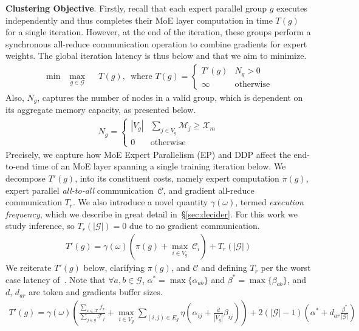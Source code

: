 \textbf{Clustering Objective}.
Firstly, recall that each expert parallel group $g$ executes independently and thus completes their MoE layer
computation in time $T(g)$ for a single iteration.
However, at the end of the iteration, these groups perform a synchronous all-reduce communication operation to
combine gradients for expert weights.
The global iteration latency is thus below and that we aim to minimize.
\begin{align}
    \label{eq:obj}
    \min \enspace \max_{g \in \mathcal{G}}\enspace & T(g),
    \enspace \text{where } T(g) = \begin{cases}
                                      T'(g) & N_g > 0 \\
                                      \infty & \text{otherwise}
    \end{cases}
\end{align}
Also, $N_g$, captures the number of nodes in a valid group, which is dependent on its aggregate memory capacity,
as presented below.
\begin{align}\label{eqn:omega_group}
N_g = \begin{cases}
          |V_g| & \sum\limits_{j \in V_g}{\mathcal{M}_j} \geq \mathcal{X}_m \\
          0 & \text{otherwise}
\end{cases}
\end{align}
Precisely, we capture how MoE Expert Parallelism (EP) and DDP affect the end-to-end time of an MoE layer spanning a
single training iteration below.
We decompose $T'(g)$, into its constituent costs, namely expert computation $\pi(g)$,
expert parallel \emph{all-to-all} communication~$\mathcal{C}$, and gradient all-reduce communication $T_r$.
We also introduce a novel quantity $\gamma(\omega)$, termed \emph{execution frequency},
which we describe in great detail in~\S\ref{sec:decider}.
For this work we study inference, so $T_{r}(|\mathcal{G}|) = 0$ due to no gradient communication.
\begin{align}\label{eqn:objective2}
T'(g) = \gamma(\omega)\left( \pi(g) + \max_{i \in V_g} \> \mathcal{C}_i \right) + T_{r}(|\mathcal{G}|)
\end{align}
We reiterate $T'(g)$ below,
clarifying $\pi(g)$, and $\mathcal{C}$ and defining $T_r$ per the worst case latency of~\cite{raben}.
Note that $\forall a, b \in \mathcal{G}$, $\alpha^* = \max \{\alpha_{ab}\}$ and $\beta^* = \max \{\beta_{ab}\}$,
and $d$, $d_{ar}$ are token and gradients buffer sizes.
\begin{multline}\label{eq:clustering_objective}
T'(g) = \gamma(\omega)\left(\frac{\sum\limits_{x \in \mathcal{X}}f_x}{\sum\limits_{j \in  g}\mathcal{F}_{j}}
                          + \max_{i \in V_g} \sum_{(i,j) \in E_g} \eta(\alpha_{ij} + \frac{d}{|V_g|}\beta_{ij}) \right) +
2(|\mathcal{G}| - 1)\left(  \alpha^{*} + d_{ar}\frac{\beta^{*}}{|\mathcal{G}|} \right)
\end{multline}

